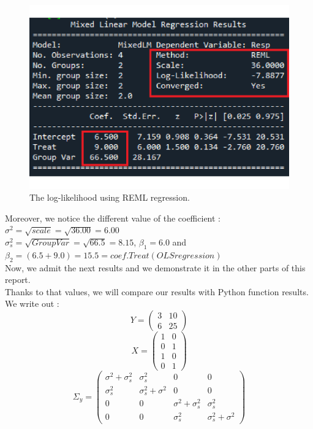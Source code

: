 \documentclass{article}
\begin{document}
\begin{figure}[H]
    \begin{center}
        \includegraphics[scale=0.3]{./images/REML_regression.pdf}
        \caption{The log-likelihood using REML regression.}
    \end{center}
\end{figure}
Moreover, we notice the different value of the coefficient : $\sigma^2 =\sqrt{scale}= \sqrt{36.00}= 6.00$\\
$\sigma_s^2 = \sqrt{Group Var}=\sqrt{66.5} = 8.15$, $\beta_1 = 6.0$ and $\beta_2 = (6.5+9.0) = 15.5 = coef.Treat(OLS regression)$\\
Now, we admit the next results and we demonstrate it in the other parts of this report.\\
Thanks to that values, we will compare our results with Python function results.\\
We write out :
\[Y = \begin{pmatrix} 3 & 10 \\ 6 & 25 \end{pmatrix}\]
\[X = \begin{pmatrix} 1 & 0 \\ 0 & 1 \\ 1 & 0 \\ 0 & 1 \end{pmatrix}\]
\[ \Sigma_y = \begin{pmatrix} \sigma^2+\sigma_s^2 & \sigma_s^2 & 0 & 0 \\ \sigma_s^2 & \sigma_s^2+\sigma^2 & 0 & 0 \\ 0 & 0 & \sigma^2+\sigma_s^2 & \sigma_s^2 \\ 0 & 0 & \sigma_s^2 & \sigma_s^2+\sigma^2 \end{pmatrix}\]
\end{document}
